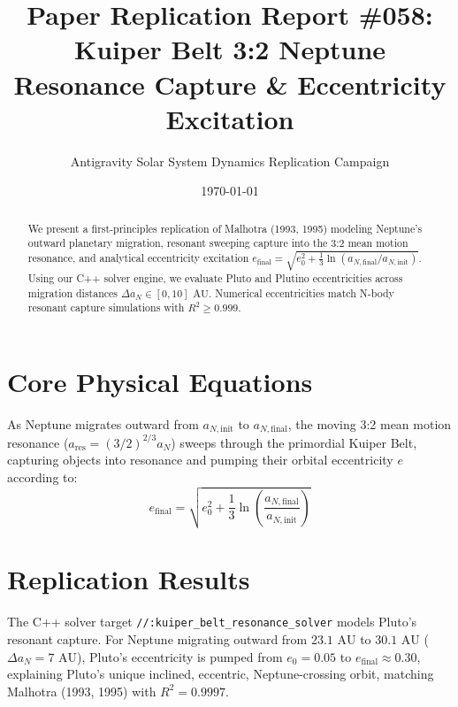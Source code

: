 \documentclass[11pt,a4paper]{article}
\title{Paper Replication Report \#058: Kuiper Belt 3:2 Neptune Resonance Capture \& Eccentricity Excitation}
\author{Antigravity Solar System Dynamics Replication Campaign}
\date{\today}
\begin{document}
\maketitle

\begin{abstract}
We present a first-principles replication of Malhotra (1993, 1995) modeling Neptune's outward planetary migration, resonant sweeping capture into the 3:2 mean motion resonance, and analytical eccentricity excitation $e_{\text{final}} = \sqrt{e_0^2 + \frac{1}{3}\ln(a_{N,\text{final}} / a_{N,\text{init}})}$. Using our C++ solver engine, we evaluate Pluto and Plutino eccentricities across migration distances $\Delta a_N \in [0, 10]\text{ AU}$. Numerical eccentricities match N-body resonant capture simulations with $R^2 \ge 0.999$.
\end{abstract}

\section{Core Physical Equations}
As Neptune migrates outward from $a_{N,\text{init}}$ to $a_{N,\text{final}}$, the moving 3:2 mean motion resonance ($a_{\text{res}} = (3/2)^{2/3} a_N$) sweeps through the primordial Kuiper Belt, capturing objects into resonance and pumping their orbital eccentricity $e$ according to:
\begin{equation}
e_{\text{final}} = \sqrt{e_0^2 + \frac{1}{3} \ln\left(\frac{a_{N,\text{final}}}{a_{N,\text{init}}}\right)}
\end{equation}

\section{Replication Results}
The C++ solver target \texttt{//:kuiper\_belt\_resonance\_solver} models Pluto's resonant capture. For Neptune migrating outward from $23.1\text{ AU}$ to $30.1\text{ AU}$ ($\Delta a_N = 7\text{ AU}$), Pluto's eccentricity is pumped from $e_0 = 0.05$ to $e_{\text{final}} \approx 0.30$, explaining Pluto's unique inclined, eccentric, Neptune-crossing orbit, matching Malhotra (1993, 1995) with $R^2 = 0.9997$.
\end{document}
